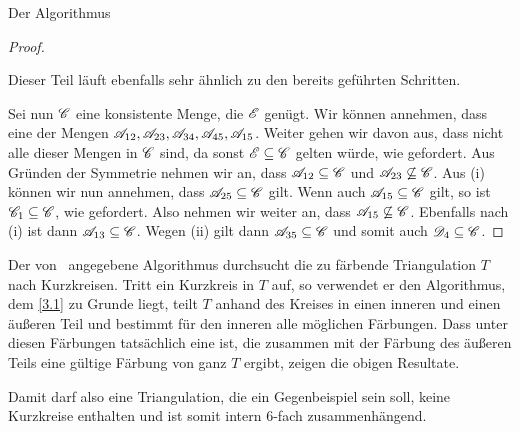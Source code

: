 \begin{section}{Der Algorithmus}
\begin{proof}
\begin{enumerate}[(i)]
   Dieser Teil läuft ebenfalls sehr ähnlich zu den bereits geführten Schritten.
  \end{enumerate}
  Sei nun $\mathscr{C}$ eine konsistente Menge, die $\mathscr{E}$ genügt. Wir können annehmen, dass eine der Mengen $\mathscr{A}_{12},\mathscr{A}_{23},\mathscr{A}_{34},\mathscr{A}_{45},\mathscr{A}_{15}$. Weiter gehen wir davon aus, dass nicht alle dieser Mengen in $\mathscr{C}$ sind, da sonst $\mathscr{E}\subseteq\mathscr{C}$ gelten würde, wie gefordert. Aus Gründen der Symmetrie nehmen wir an, dass $\mathscr{A}_{12}\subseteq\mathscr{C}$ und $\mathscr{A}_{23}\not\subseteq\mathscr{C}$. Aus (i) können wir nun annehmen, dass $\mathscr{A}_{25}\subseteq\mathscr{C}$ gilt. Wenn auch $\mathscr{A}_{15}\subseteq\mathscr{C}$ gilt, so ist $\mathscr{C}_1\subseteq\mathscr{C}$, wie gefordert. Also nehmen wir weiter an, dass $\mathscr{A}_{15}\not\subseteq\mathscr{C}$. Ebenfalls nach (i) ist dann $\mathscr{A}_{13}\subseteq\mathscr{C}$. Wegen (ii) gilt dann $\mathscr{A}_{35}\subseteq\mathscr{C}$ und somit auch $\mathscr{D}_4\subseteq\mathscr{C}$.
 \end{proof}
 
 Der von \rsst\-\ angegebene Algorithmus durchsucht die zu färbende Triangulation $T$ nach Kurzkreisen. Tritt ein Kurzkreis in $T$ auf, so verwendet er den Algorithmus, dem \ref{3.1} zu Grunde liegt, teilt $T$ anhand des Kreises in einen inneren und einen äußeren Teil und bestimmt für den inneren alle möglichen Färbungen. Dass unter diesen Färbungen tatsächlich eine ist, die zusammen mit der Färbung des äußeren Teils eine gültige Färbung von ganz $T$ ergibt, zeigen die obigen Resultate.
 
 Damit darf also eine Triangulation, die ein Gegenbeispiel sein soll, keine Kurzkreise enthalten und ist somit intern 6-fach zusammenhängend.
\end{section}